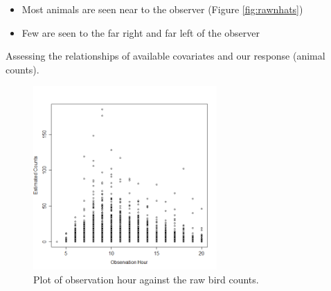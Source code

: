 \begin{itemize}
\item Most animals are seen near to the observer (Figure \ref{fig:rawnhats})
\item Few are seen to the far right and far left of the observer
\end{itemize}


\begin{frame}
Assessing the relationships of available covariates and our response (animal counts).
\end{frame}
\begin{frame}
\begin{figure}[h!]
  \centering
  \includegraphics[width=7cm]{bc/obshour.png}
\caption{Plot of observation hour against the raw bird counts.}
\label{fig:nsexploratory1}
\end{figure}
\end{frame}

